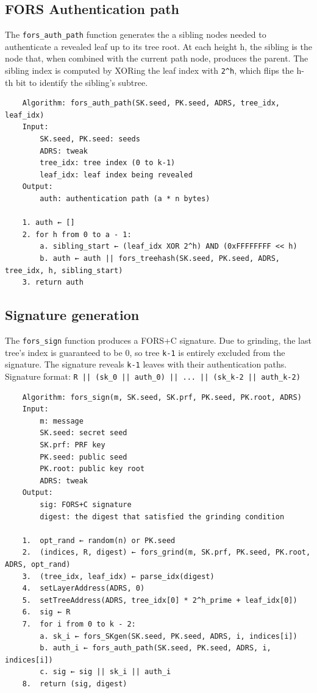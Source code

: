 \subsection{FORS Authentication path}
The \texttt{fors\_auth\_path} function generates the a sibling nodes needed to authenticate a revealed leaf up to its tree root. At each height h, the sibling is the node that, when combined with the current path node, produces the parent. The sibling index is computed by XORing the leaf index with \texttt{2\string^h}, which flips the h-th bit to identify the sibling's subtree.
\begin{verbatim}
    Algorithm: fors_auth_path(SK.seed, PK.seed, ADRS, tree_idx, leaf_idx)
    Input:
        SK.seed, PK.seed: seeds
        ADRS: tweak
        tree_idx: tree index (0 to k-1)
        leaf_idx: leaf index being revealed
    Output:
        auth: authentication path (a * n bytes)

    1. auth ← []
    2. for h from 0 to a - 1:
        a. sibling_start ← (leaf_idx XOR 2^h) AND (0xFFFFFFFF << h)
        b. auth ← auth || fors_treehash(SK.seed, PK.seed, ADRS, tree_idx, h, sibling_start)
    3. return auth
\end{verbatim}

\subsection{Signature generation}
The \texttt{fors\_sign} function produces a FORS+C signature. Due to grinding, the last tree's index is guaranteed to be 0, so tree \texttt{k-1} is entirely excluded from the signature. The signature reveals \texttt{k-1} leaves with their authentication paths. Signature format: \texttt{R || (sk\_0 || auth\_0) || ... || (sk\_{k-2} || auth\_{k-2})}
\begin{verbatim}
    Algorithm: fors_sign(m, SK.seed, SK.prf, PK.seed, PK.root, ADRS)
    Input:
        m: message
        SK.seed: secret seed
        SK.prf: PRF key
        PK.seed: public seed
        PK.root: public key root
        ADRS: tweak
    Output:
        sig: FORS+C signature
        digest: the digest that satisfied the grinding condition

    1.  opt_rand ← random(n) or PK.seed
    2.  (indices, R, digest) ← fors_grind(m, SK.prf, PK.seed, PK.root, ADRS, opt_rand)
    3.  (tree_idx, leaf_idx) ← parse_idx(digest)
    4.  setLayerAddress(ADRS, 0)
    5.  setTreeAddress(ADRS, tree_idx[0] * 2^h_prime + leaf_idx[0])
    6.  sig ← R
    7.  for i from 0 to k - 2:
        a. sk_i ← fors_SKgen(SK.seed, PK.seed, ADRS, i, indices[i])
        b. auth_i ← fors_auth_path(SK.seed, PK.seed, ADRS, i, indices[i])
        c. sig ← sig || sk_i || auth_i
    8.  return (sig, digest)
\end{verbatim}

